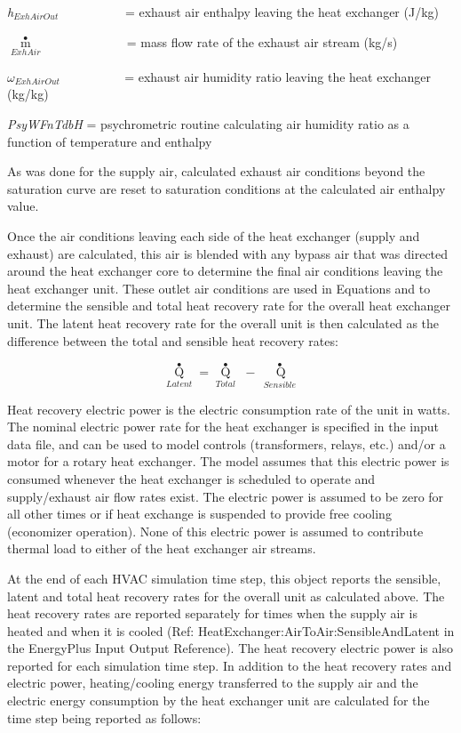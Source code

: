 \emph{h\(_{ExhAirOut}\)}~~~~~~~~~~ = exhaust air enthalpy leaving the heat exchanger (J/kg)

\({\mathop m\limits^ \bullet_{ExhAir}}\) ~~~~~~~~~~~~ = mass flow rate of the exhaust air stream (kg/s)

\({\omega_{ExhAirOut}}\) ~~~~~~~~~ = exhaust air humidity ratio leaving the heat exchanger (kg/kg)

\emph{PsyWFnTdbH} = psychrometric routine calculating air humidity ratio as a function of temperature and enthalpy

As was done for the supply air, calculated exhaust air conditions beyond the saturation curve are reset to saturation conditions at the calculated air enthalpy value.

Once the air conditions leaving each side of the heat exchanger (supply and exhaust) are calculated, this air is blended with any bypass air that was directed around the heat exchanger core to determine the final air conditions leaving the heat exchanger unit. These outlet air conditions are used in Equations and to determine the sensible and total heat recovery rate for the overall heat exchanger unit. The latent heat recovery rate for the overall unit is then calculated as the difference between the total and sensible heat recovery rates:

\begin{equation}
{\mathop Q\limits^ \bullet_{Latent}} = {\mathop Q\limits^ \bullet_{Total}}\,\, - \,{\mathop {\,Q}\limits^ \bullet_{Sensible}}
\end{equation}

Heat recovery electric power is the electric consumption rate of the unit in watts. The nominal electric power rate for the heat exchanger is specified in the input data file, and can be used to model controls (transformers, relays, etc.) and/or a motor for a rotary heat exchanger. The model assumes that this electric power is consumed whenever the heat exchanger is scheduled to operate and supply/exhaust air flow rates exist. The electric power is assumed to be zero for all other times or if heat exchange is suspended to provide free cooling (economizer operation). None of this electric power is assumed to contribute thermal load to either of the heat exchanger air streams.

At the end of each HVAC simulation time step, this object reports the sensible, latent and total heat recovery rates for the overall unit as calculated above. The heat recovery rates are reported separately for times when the supply air is heated and when it is cooled (Ref: HeatExchanger:AirToAir:SensibleAndLatent in the EnergyPlus Input Output Reference). The heat recovery electric power is also reported for each simulation time step. In addition to the heat recovery rates and electric power, heating/cooling energy transferred to the supply air and the electric energy consumption by the heat exchanger unit are calculated for the time step being reported as follows:

